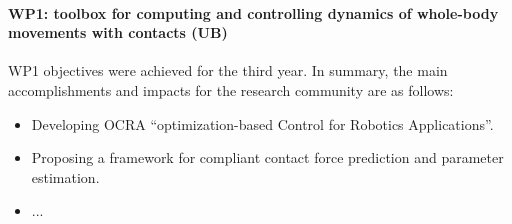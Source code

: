 

\paragraph*{WP1: toolbox for computing and controlling dynamics of whole-body
  movements with contacts (UB)}

WP1 objectives were achieved for the third year.  In summary, the main
accomplishments and impacts for the research community are as follows:

\begin{itemize}

\item Developing OCRA ``optimization-based Control for Robotics Applications''.

\item Proposing a framework for compliant contact force prediction and parameter estimation.

\item ...
 
 \end{itemize}

